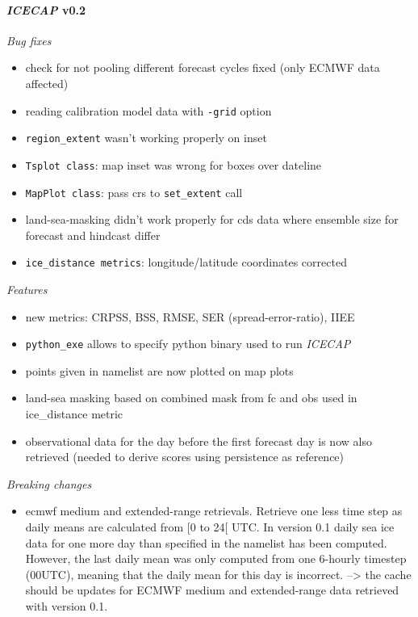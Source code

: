 \documentclass[DIV=10, parskip=full]{scrreprt}
\newcommand{\ice}{\textit{ICECAP}\xspace}
\begin{document}
\paragraph{\textbf{\ice v0.2\\[5pt]}}

\textit{Bug fixes}
\begin{itemize}
	\item check for not pooling different forecast cycles fixed (only ECMWF data affected)
	\item  reading calibration model data with \texttt{-grid} option
	\item \texttt{region\_extent} wasn't working properly on inset
	\item \texttt{Tsplot class}: map inset was wrong for boxes over dateline 
	\item \texttt{MapPlot class}: pass crs to \texttt{set\_extent} call
	\item land-sea-masking didn't work properly for cds data where ensemble size for forecast and hindcast  differ
	\item \texttt{ice\_distance metrics}: longitude/latitude coordinates corrected
	
\end{itemize}

\textit{Features}
\begin{itemize}
	\item new metrics: CRPSS, BSS, RMSE, SER (spread-error-ratio), IIEE
	\item \texttt{python\_exe} allows to specify python binary used to run \ice
	\item points given in namelist are now plotted on map plots
	\item land-sea masking based on combined mask from fc and obs used in ice\_distance metric
	\item observational data for the day before the first forecast day is now also retrieved (needed to derive scores using persistence as reference)
\end{itemize}

\textit{Breaking changes}
\begin{itemize}
	\item ecmwf medium and extended-range retrievals. Retrieve one less time step as daily means are calculated from [0 to 24[ UTC. In version 0.1 daily sea ice data for one more day than specified in the namelist has been computed. However, the last daily mean was only computed from one 6-hourly timestep (00UTC), meaning that the daily mean for this day is incorrect. --> the cache should be updates for ECMWF medium and extended-range data retrieved with version 0.1.
\end{itemize}
\end{document}
